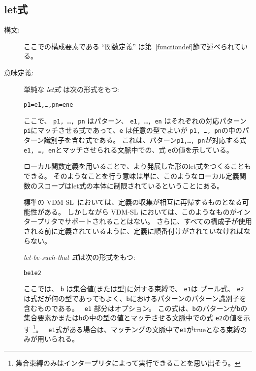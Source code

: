 \documentclass[\pformat,12pt]{jarticle}
\newcommand{\vdmslpp}[2]{%
#1
}
\newcommand{\vdmsl}{VDM-SL}
\newcommand{\vdmpp}{VDM++}
\begin{document}
\subsection{let式}\label{let-exp}

\begin{description}
\item[構文:]





  \noindent ここでの構成要素である ``関数定義'' は第~\ref{functiondef}節で述べられている。

\item[意味定義:] 単純な {\it let式} は次の形式をもつ:
  \begin{alltt}
     p1 = e1, \ldots, pn = en  e
  \end{alltt}
ここで、 {\tt p1, \ldots, pn} はパターン、 {\tt e1, \ldots, en} はそれぞれの対応パターン {\tt pi}にマッチさせる式であって、{\tt e} は任意の型でよいが {\tt p1, \ldots, pn}の中のパターン識別子を含む式である。 
これは、パターン{\tt p1,\ldots, pn}が対応する式{\tt e1, \ldots, en}とマッチさせられる文脈中での、式 {\tt e}の値を示している。 

 ローカル関数定義を用いることで、より発展した形のlet式をつくることもできる。
そのようなことを行う意味は単に、このようなローカル定義関数のスコープはlet式の本体に制限されているということにある。

標準の \vdmsl\ においては、定義の収集が相互に再帰するものとなる可能性がある。
しかしながら\vdmslpp{\vdmsl}{\vdmpp}においては、このようなものがインタープリタでサポートされることはない。 
さらに、すべての構成子が使用される前に定義されているように、定義に順番付けがされていなければならない。
     
   {\it let-be-such-that 式}は次の形式をもつ:
  \begin{alltt}
     b  e1  e2
  \end{alltt}%
ここでは、 {\tt b} は集合値(または型)に対する束縛で、 {\tt e1}は ブール式、 {\tt e2} は式だが何の型であってもよく、{\tt b}におけるパターンのパターン識別子を含むものである。
 {\tt {} e1} 部分はオプション。
この式は、{\tt b}のパターンが{\tt b}の集合要素かまたは{\tt b}の中の型の値とマッチさせる文脈中での式 {\tt e2}の値を示す
  \footnote{集合束縛のみはインタープリタによって実行できることを思い出そう。}。 {\tt {} e1}式がある場合は、マッチングの文脈中で{\tt e1}がtrueとなる束縛のみが用いられる。


\end{description}
\end{document}
